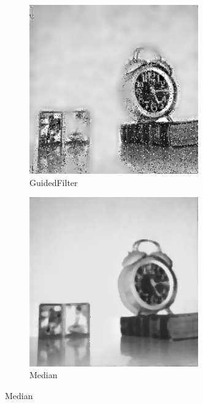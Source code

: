 \documentclass[12pt]{article}
\begin{document}
\begin{figure}
		\begin{subfigure}{0.4\textwidth}
			\centering
			\includegraphics[width=0.8\textwidth]{saltandpepper/SaltAndPepperpngGuidedFilter.png}
			\caption{GuidedFilter}
		\end{subfigure}
		\begin{subfigure}{0.4\textwidth}
			\centering
			\includegraphics[width=0.8\textwidth]{saltandpepper/SaltAndPepperpngMedianFilter.png}
			\caption{Median}
		\end{subfigure}
		

\end{figure}
\end{document}
